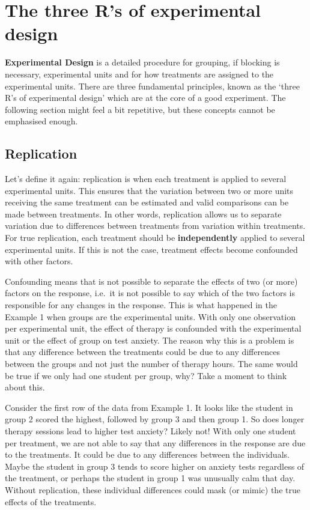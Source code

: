\documentclass[
  letterpaper,
  DIV=11,
  numbers=noendperiod,
  oneside]{scrreprt}
\begin{document}
\chapter{The three R's of experimental
design}\label{the-three-rs-of-experimental-design}

\textbf{Experimental Design} is a detailed procedure for grouping, if
blocking is necessary, experimental units and for how treatments are
assigned to the experimental units. There are three fundamental
principles, known as the `three R's of experimental design' which are at
the core of a good experiment. The following section might feel a bit
repetitive, but these concepts cannot be emphasised enough.

\section{Replication}\label{replication}

Let's define it again: replication is when each treatment is applied to
several experimental units. This ensures that the variation between two
or more units receiving the same treatment can be estimated and valid
comparisons can be made between treatments. In other words, replication
allows us to separate variation due to differences between treatments
from variation within treatments. For true replication, each treatment
should be \textbf{independently} applied to several experimental units.
If this is not the case, treatment effects become confounded with other
factors.

Confounding means that is not possible to separate the effects of two
(or more) factors on the response, i.e.~it is not possible to say which
of the two factors is responsible for any changes in the response. This
is what happened in the Example 1 when groups are the experimental
units. With only one observation per experimental unit, the effect of
therapy is confounded with the experimental unit or the effect of group
on test anxiety. The reason why this is a problem is that any difference
between the treatments could be due to any differences between the
groups and not just the number of therapy hours. The same would be true
if we only had one student per group, why? Take a moment to think about
this.

Consider the first row of the data from Example 1. It looks like the
student in group 2 scored the highest, followed by group 3 and then
group 1. So does longer therapy sessions lead to higher test anxiety?
Likely not! With only one student per treatment, we are not able to say
that any differences in the response are due to the treatments. It could
be due to any differences between the individuals. Maybe the student in
group 3 tends to score higher on anxiety tests regardless of the
treatment, or perhaps the student in group 1 was unusually calm that
day. Without replication, these individual differences could mask (or
mimic) the true effects of the treatments.
\end{document}
